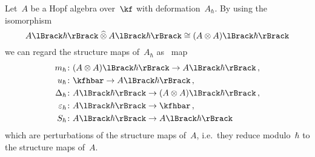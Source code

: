 \documentclass[a4paper, 11pt, oneside]{scrartcl}
\begin{document}
\begin{remark}
  Let~$A$ be a Hopf algebra over~$\kf$ with deformation~$A_{\hbar}$.
  By using the isomorphism
  \[
    \power{A}{\hbar} \ctensor \power{A}{\hbar}
    \cong
    \power{(A \tensor A)}{\hbar}
  \]
  we can regard the structure maps of~$A_{\hbar}$ as~\linear{$\kfhbar$} map
  \begin{equation}
    \label{explicit description of deformed hopf algebra}
    \begin{aligned}
      m_{\hbar} &\colon \power{(A \tensor A)}{\hbar} \to \power{A}{\hbar} \,,
      \\
      u_{\hbar} &\colon \kfhbar \to \power{A}{\hbar} \,,
      \\
      \Delta_{\hbar} &\colon \power{A}{\hbar} \to \power{(A \tensor A)}{\hbar} \,,
      \\
      \varepsilon_{\hbar} &\colon \power{A}{\hbar} \to \kfhbar \,,
      \\
      S_{\hbar} &\colon \power{A}{\hbar} \to \power{A}{\hbar}
    \end{aligned}
  \end{equation}
  which are perturbations of the structure maps of~$A$, i.e.\ they reduce modulo~$\hbar$ to the structure maps of~$A$.

\end{remark}
\end{document}

